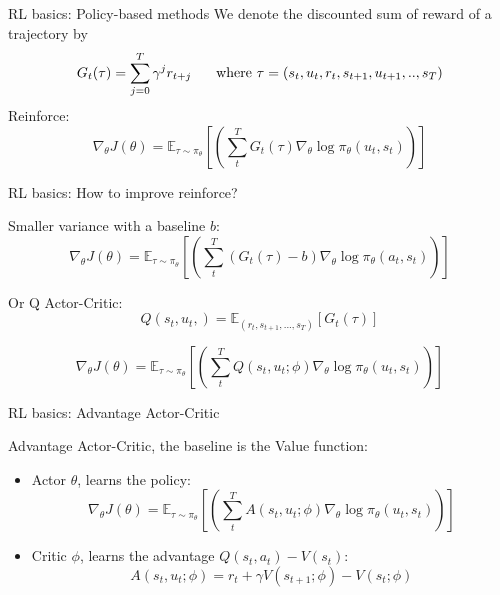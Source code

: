 \documentclass{beamer}
\begin{document}
\begin{frame}{RL basics: Policy-based methods}
\vfill
We denote the discounted sum of reward of a trajectory by 
\begin{equation*}
G_t(\tau)  = \sum_{j=0}^T \gamma^j r_{t+j} \hspace{.5cm} \text{ where } \tau = (s_t, u_t, r_t, s_{t+1}, u_{t+1},.., s_T)
\end{equation*}
\vfill
Reinforce:
\begin{equation*}
        \nabla_\theta J(\theta)  = \mathbb{E}_{\tau \sim \pi_\theta}\left[\left(  \sum_t^T G_t(\tau)  \nabla_\theta  \log \pi_\theta(u_t, s_t)  \right)\right] 
\end{equation*}


\end{frame}

\begin{frame}{RL basics: How to improve reinforce?}

Smaller variance with a baseline $b$:
\begin{equation*}
\nabla_\theta J(\theta)  = \mathbb{E}_{\tau \sim \pi_\theta}\left[ \left( \sum_t^T \left( G_t(\tau)-b \right) \nabla_\theta \log \pi_\theta(a_t, s_t) \right) \right] 
\end{equation*}

\vfill
 
Or Q Actor-Critic:
$$Q(s_t, u_t,) = \mathbb{E}_{(r_t, s_{t+1},...,s_T)}\left[G_t(\tau) \right]$$

$$\nabla_\theta J(\theta)  = \mathbb{E}_{\tau \sim \pi_\theta}\left[\left( \sum_t^T Q(s_t, u_t; \phi) \nabla_\theta  \log \pi_\theta(u_t, s_t) \right) \right] $$




\end{frame}

\begin{frame}{RL basics: Advantage Actor-Critic}

    
Advantage Actor-Critic, the baseline is the Value function:

\begin{itemize}
    \item Actor $\theta$, learns the policy:
    \vfill
    \begin{equation*}
         \nabla_\theta J(\theta)  = \mathbb{E}_{\tau \sim \pi_\theta}\left[ \left(\sum_t^T A(s_t, u_t; \phi) \nabla_\theta \log \pi_\theta(u_t, s_t)  \right) \right] 
    \end{equation*}
    \vfill
    \item Critic $\phi$, learns the advantage $Q(s_t, a_t) - V(s_t)$:
    \vfill
    \begin{equation*}
        A(s_t, u_t; \phi) = r_t + \gamma V(s_{t+1}; \phi) - V(s_t; \phi)
    \end{equation*}
\end{itemize}{}

\end{frame}
\end{document}
